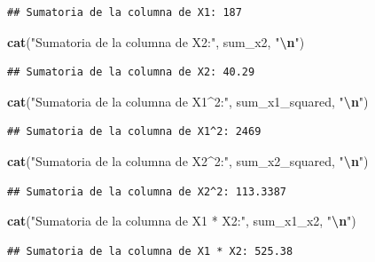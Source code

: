 \documentclass[
]{book}
\newenvironment{Shaded}{\begin{snugshade}}{\end{snugshade}}
\newcommand{\FunctionTok}[1]{\textcolor[rgb]{0.13,0.29,0.53}{\textbf{#1}}}
\newcommand{\NormalTok}[1]{#1}
\newcommand{\SpecialCharTok}[1]{\textcolor[rgb]{0.81,0.36,0.00}{\textbf{#1}}}
\newcommand{\StringTok}[1]{\textcolor[rgb]{0.31,0.60,0.02}{#1}}
\begin{document}
\begin{verbatim}
## Sumatoria de la columna de X1: 187
\end{verbatim}

\begin{Shaded}
\begin{Highlighting}[]
\FunctionTok{cat}\NormalTok{(}\StringTok{"Sumatoria de la columna de X2:"}\NormalTok{, sum\_x2, }\StringTok{"}\SpecialCharTok{\textbackslash{}n}\StringTok{"}\NormalTok{)}
\end{Highlighting}
\end{Shaded}

\begin{verbatim}
## Sumatoria de la columna de X2: 40.29
\end{verbatim}

\begin{Shaded}
\begin{Highlighting}[]
\FunctionTok{cat}\NormalTok{(}\StringTok{"Sumatoria de la columna de X1\^{}2:"}\NormalTok{, sum\_x1\_squared, }\StringTok{"}\SpecialCharTok{\textbackslash{}n}\StringTok{"}\NormalTok{)}
\end{Highlighting}
\end{Shaded}

\begin{verbatim}
## Sumatoria de la columna de X1^2: 2469
\end{verbatim}

\begin{Shaded}
\begin{Highlighting}[]
\FunctionTok{cat}\NormalTok{(}\StringTok{"Sumatoria de la columna de X2\^{}2:"}\NormalTok{, sum\_x2\_squared, }\StringTok{"}\SpecialCharTok{\textbackslash{}n}\StringTok{"}\NormalTok{)}
\end{Highlighting}
\end{Shaded}

\begin{verbatim}
## Sumatoria de la columna de X2^2: 113.3387
\end{verbatim}

\begin{Shaded}
\begin{Highlighting}[]
\FunctionTok{cat}\NormalTok{(}\StringTok{"Sumatoria de la columna de X1 * X2:"}\NormalTok{, sum\_x1\_x2, }\StringTok{"}\SpecialCharTok{\textbackslash{}n}\StringTok{"}\NormalTok{)}
\end{Highlighting}
\end{Shaded}

\begin{verbatim}
## Sumatoria de la columna de X1 * X2: 525.38
\end{verbatim}
\end{document}
